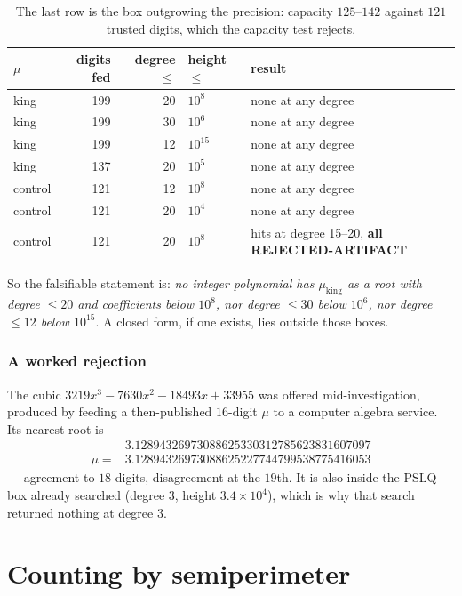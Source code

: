 \documentclass[11pt]{article}
\begin{document}
\begin{table}[H]
\centering\small
\begin{tabular}{l r r l l}
\toprule
$\mu$ & digits fed & degree $\le$ & height $\le$ & result \\
\midrule
king & 199 & 20 & $10^{8}$ & none at any degree \\
king & 199 & 30 & $10^{6}$ & none at any degree \\
king & 199 & 12 & $10^{15}$ & none at any degree \\
king & 137 & 20 & $10^{5}$ & none at any degree \\
control & 121 & 12 & $10^{8}$ & none at any degree \\
control & 121 & 20 & $10^{4}$ & none at any degree \\
control & 121 & 20 & $10^{8}$ & hits at degree 15--20, \textbf{all REJECTED-ARTIFACT} \\
\bottomrule
\end{tabular}
\caption{The last row is the box outgrowing the precision: capacity
$125$--$142$ against $121$ trusted digits, which the capacity test
rejects.}
\label{tab:pslq}
\end{table}

So the falsifiable statement is: \emph{no integer polynomial has $\mu_{\text{king}}$
as a root with degree $\le 20$ and coefficients below $10^8$, nor degree $\le 30$
below $10^6$, nor degree $\le 12$ below $10^{15}$}. A closed form, if one exists,
lies outside those boxes.

\subsubsection*{A worked rejection}

The cubic $3219x^3 - 7630x^2 - 18493x + 33955$ was offered mid-investigation,
produced by feeding a then-published $16$-digit $\mu$ to a computer algebra
service. Its nearest root is
\[
  \begin{aligned}
    &3.12894326973088625330312785623831607097 \\
    \mu = {}&3.12894326973088625227744799538775416053
  \end{aligned}
\]
--- agreement to $18$ digits, disagreement at the $19$th. It is also inside the
PSLQ box already searched (degree $3$, height $3.4\times10^4$), which is why that
search returned nothing at degree $3$.

\section{Counting by semiperimeter}
\label{sec:perimeter}
\end{document}
